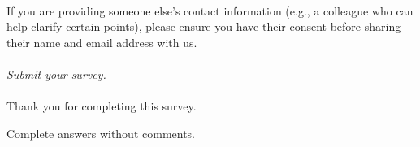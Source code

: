\documentclass[headsepline,titlepage,twoside,12pt,toc=flat,headings=normal]{scrreprt}
\begin{document}
\paragraph{}
If you are providing someone else's contact information (e.g., a colleague who can help clarify certain points), please ensure you have their consent before sharing their name and email address with us.

\paragraph{}
\emph{Submit your survey.}

\paragraph{}
Thank you for completing this survey.


\clearpage
\begin{sidewaystable}
\caption{Complete answers without comments.}
\label{tab:results}
\tiny
\setlength{\tabcolsep}{2pt}

\end{sidewaystable}
\restoregeometry

\end{document}
